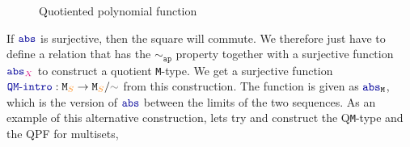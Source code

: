\documentclass[twoside,11pt,openright]{report}
\theoremstyle{plain} %
\theoremstyle{definition}
\theoremstyle{remark}
\newcommand*{\type}[1]{\textcolor{magenta!90!black}{#1}}
\newcommand*{\container}[1]{\textcolor{orange}{#1}}
\newcommand*{\relation}[1]{\textcolor{gray!75!black}{\ensuremath{\mathtt{#1}}}}
\newcommand*{\function}[1]{\textcolor{blue!60!black}{\ensuremath{\mathtt{#1}}}}
\newcommand*{\typeformer}[1]{\ensuremath{\mathtt{#1}}}
\newcommand*{\functor}[1]{\ensuremath{\mathbf{\mathtt{#1}}}}
\begin{document}
\begin{figure}[h]
  \centering
  \caption{Quotiented polynomial function}
  \label{fig:QPF-diagram}
\end{figure}
If \(\function{abs}\) is surjective, then the square will commute. We therefore just have to define a relation that has the \function{\sim_{ap}} property together with a surjective function \(\function{abs}_{\type{X}}\) to construct a quotient \texttt{M}-type. We get a surjective function \(\function{QM\text{-}intro} : \typeformer{M}_{\container{S}} \rightarrow \typeformer{M}_{\container{S}} / \relation{\sim}\) from this construction. The function is given as \(\function{abs}_{\typeformer{M}}\), which is the version of \(\function{abs}\) between the limits of the two sequences. As an example of this alternative construction, lets try and construct the Q\texttt{M}-type and the QPF for multisets,
\end{document}
